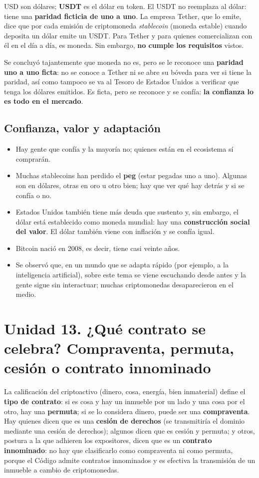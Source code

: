 \documentclass[12pt,oneside,a4paper]{book}
\begin{document}
USD son dólares; \textbf{USDT} es el dólar en token. El USDT no reemplaza al dólar: tiene una \textbf{paridad ficticia de uno a uno}. La empresa Tether, que lo emite, dice que por cada emisión de criptomoneda \emph{stablecoin} (moneda estable) cuando deposita un dólar emite un USDT. Para Tether y para quienes comercializan con él en el día a día, es moneda. Sin embargo, \textbf{no cumple los requisitos} vistos.

Se concluyó tajantemente que moneda no es, pero se le reconoce una \textbf{paridad uno a uno ficta}: no se conoce a Tether ni se abre su bóveda para ver si tiene la paridad, así como tampoco se va al Tesoro de Estados Unidos a verificar que tenga los dólares emitidos. Es ficta, pero se reconoce y se confía: \textbf{la confianza lo es todo en el mercado}.

\subsection{Confianza, valor y adaptación}

\begin{itemize}
    \item Hay gente que confía y la mayoría no; quienes están en el ecosistema sí comprarán.
    \item Muchas stablecoins han perdido el \textbf{peg} (estar pegadas uno a uno). Algunas son en dólares, otras en oro u otro bien; hay que ver qué hay detrás y si se confía o no.
    \item Estados Unidos también tiene más deuda que sustento y, sin embargo, el dólar está establecido como moneda mundial: hay una \textbf{construcción social del valor}. El dólar también viene con inflación y se confía igual.
    \item Bitcoin nació en 2008, es decir, tiene casi veinte años.
    \item Se observó que, en un mundo que se adapta rápido (por ejemplo, a la inteligencia artificial), sobre este tema se viene escuchando desde antes y la gente sigue sin interactuar; muchas criptomonedas desaparecieron en el medio.
\end{itemize}

\section{Unidad 13. ¿Qué contrato se celebra? Compraventa, permuta, cesión o contrato innominado}

La calificación del criptoactivo (dinero, cosa, energía, bien inmaterial) define el \textbf{tipo de contrato}: si es cosa y hay un inmueble por un lado y una cosa por el otro, hay una \textbf{permuta}; si se lo considera dinero, puede ser una \textbf{compraventa}. Hay quienes dicen que es una \textbf{cesión de derechos} (se transmitiría el dominio mediante una cesión de derechos); algunos dicen que es cesión y permuta; y otros, postura a la que adhieren los expositores, dicen que es un \textbf{contrato innominado}: no hay que clasificarlo como compraventa ni como permuta, porque el Código admite contratos innominados y es efectiva la transmisión de un inmueble a cambio de criptomonedas.
\end{document}
